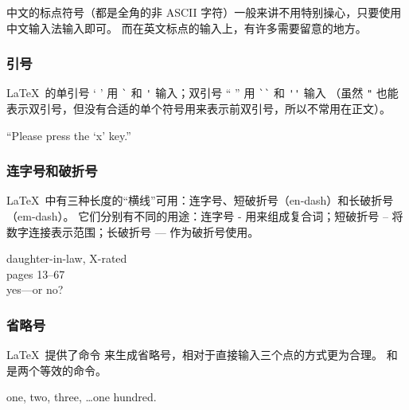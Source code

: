 中文的标点符号（都是全角的非 ASCII 字符）一般来讲不用特别操心，只要使用中文输入法输入即可。
而在英文标点的输入上，有许多需要留意的地方。

\subsubsection{引号}

\LaTeX\ 的单引号 ` ' 用 \texttt` 和 \texttt' 输入；双引号 `` '' 用 \verb|``| 和 \verb|''| 输入
（虽然 \texttt" 也能表示双引号，但没有合适的单个符号用来表示前双引号，所以不常用在正文）。
\begin{example}
``Please press the `x' key.''
\end{example}

\subsubsection{连字号和破折号}

\LaTeX\ 中有三种长度的“横线”可用：连字号、短破折号（en-dash）和长破折号（em-dash）。
它们分别有不同的用途：连字号 - 用来组成复合词；短破折号 -- 将数字连接表示范围；长破折号 --- 作为破折号使用。
\begin{example}
daughter-in-law, X-rated\\
pages 13--67\\
yes---or no?
\end{example}

\subsubsection{省略号}

\LaTeX\ 提供了命令  来生成省略号，相对于直接输入三个点的方式更为合理。
 和  是两个等效的命令。
\begin{example}
one, two, three, \ldots one hundred.
\end{example}

